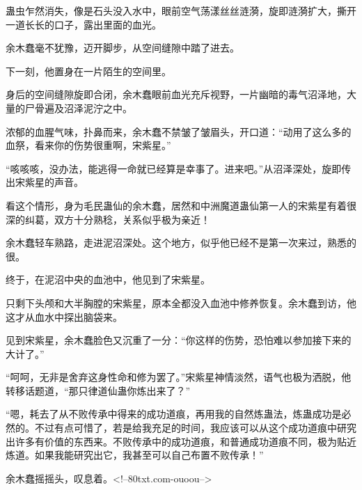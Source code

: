 \begin{this_body}
蛊虫乍然消失，像是石头没入水中，眼前空气荡漾丝丝涟漪，旋即涟漪扩大，撕开一道长长的口子，露出里面的血光。

余木蠢毫不犹豫，迈开脚步，从空间缝隙中踏了进去。

下一刻，他置身在一片陌生的空间里。

身后的空间缝隙旋即合闭，余木蠢眼前血光充斥视野，一片幽暗的毒气沼泽地，大量的尸骨遍及沼泽泥泞之中。

浓郁的血腥气味，扑鼻而来，余木蠢不禁皱了皱眉头，开口道：“动用了这么多的血祭，看来你的伤势很重啊，宋紫星。”

“咳咳咳，没办法，能逃得一命就已经算是幸事了。进来吧。”从沼泽深处，旋即传出宋紫星的声音。

看这个情形，身为毛民蛊仙的余木蠢，居然和中洲魔道蛊仙第一人的宋紫星有着很深的纠葛，双方十分熟稔，关系似乎极为亲近！

余木蠢轻车熟路，走进泥沼深处。这个地方，似乎他已经不是第一次来过，熟悉的很。

终于，在泥沼中央的血池中，他见到了宋紫星。

只剩下头颅和大半胸膛的宋紫星，原本全都没入血池中修养恢复。余木蠢到访，他这才从血水中探出脑袋来。

见到宋紫星，余木蠢脸色又沉重了一分：“你这样的伤势，恐怕难以参加接下来的大计了。”

“呵呵，无非是舍弃这身性命和修为罢了。”宋紫星神情淡然，语气也极为洒脱，他转移话题道，“那只律道仙蛊你炼出来了？”

“嗯，耗去了从不败传承中得来的成功道痕，再用我的自然炼蛊法，炼蛊成功是必然的。不过有点可惜了，若是给我充足的时间，我应该可以从这个成功道痕中研究出许多有价值的东西来。不败传承中的成功道痕，和普通成功道痕不同，极为贴近炼道。如果我能研究出它，我甚至可以自己布置不败传承！”

余木蠢摇摇头，叹息着。<!--80txt.com-ouoou-->

\end{this_body}

